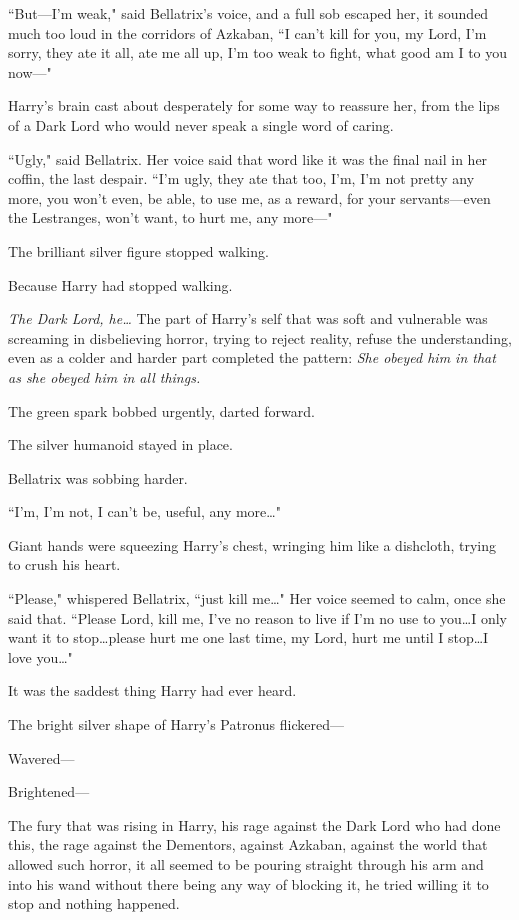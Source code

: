 ``But—I'm weak," said Bellatrix's voice, and a full sob escaped her, it sounded much too loud in the corridors of Azkaban, ``I can't kill for you, my Lord, I'm sorry, they ate it all, ate me all up, I'm too weak to fight, what good am I to you now—"

Harry's brain cast about desperately for some way to reassure her, from the lips of a Dark Lord who would never speak a single word of caring.

``Ugly," said Bellatrix. Her voice said that word like it was the final nail in her coffin, the last despair. ``I'm ugly, they ate that too, I'm, I'm not pretty any more, you won't even, be able, to use me, as a reward, for your servants—even the Lestranges, won't want, to hurt me, any more—"

The brilliant silver figure stopped walking.

Because Harry had stopped walking.

\emph{The Dark Lord, he…} The part of Harry's self that was soft and vulnerable was screaming in disbelieving horror, trying to reject reality, refuse the understanding, even as a colder and harder part completed the pattern: \emph{She obeyed him in that as she obeyed him in all things.}

The green spark bobbed urgently, darted forward.

The silver humanoid stayed in place.

Bellatrix was sobbing harder.

``I'm, I'm not, I can't be, useful, any more…"

Giant hands were squeezing Harry's chest, wringing him like a dishcloth, trying to crush his heart.

``Please," whispered Bellatrix, ``just kill me…" Her voice seemed to calm, once she said that. ``Please Lord, kill me, I've no reason to live if I'm no use to you…I only want it to stop…please hurt me one last time, my Lord, hurt me until I stop…I love you…"

It was the saddest thing Harry had ever heard.

The bright silver shape of Harry's Patronus flickered—

Wavered—

Brightened—

The fury that was rising in Harry, his rage against the Dark Lord who had done this, the rage against the Dementors, against Azkaban, against the world that allowed such horror, it all seemed to be pouring straight through his arm and into his wand without there being any way of blocking it, he tried willing it to stop and nothing happened.

